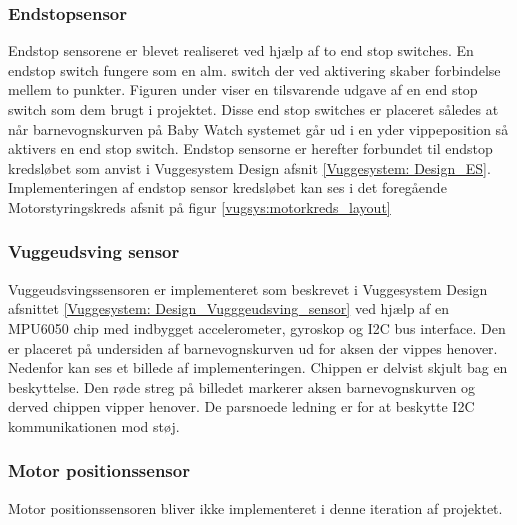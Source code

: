 \subsubsection{Endstopsensor}\label{Vuggesystem: Implementering_ES} 
Endstop sensorene er blevet realiseret ved hjælp af to end stop switches. En endstop switch fungere som en alm. switch der ved aktivering skaber forbindelse mellem to punkter. Figuren under viser en tilsvarende udgave af en end stop switch som dem brugt i projektet.
 Disse end stop switches er placeret således at når barnevognskurven på Baby Watch systemet går ud i en yder vippeposition så aktivers en end stop switch.
Endstop sensorne er herefter forbundet til endstop kredsløbet som anvist i Vuggesystem Design afsnit \vref{Vuggesystem: Design_ES}. \\
Implementeringen af endstop sensor kredsløbet kan ses i det foregående Motorstyringskreds afsnit på figur \vref{vugsys:motorkreds_layout}
\newpage
\subsubsection{Vuggeudsving sensor}
\label{Vuggesystem: Implementering_VuggeudsvingSensor}
Vuggeudsvingssensoren er implementeret som beskrevet i Vuggesystem Design afsnittet \vref{Vuggesystem: Design_Vugggeudsving_sensor} ved hjælp af en MPU6050 chip med indbygget accelerometer, gyroskop og I2C bus interface. Den er placeret på undersiden af barnevognskurven ud for aksen der vippes henover. Nedenfor kan ses et billede af implementeringen. 
Chippen er delvist skjult bag en beskyttelse. Den røde streg på billedet markerer aksen barnevognskurven og derved chippen vipper henover. 
De parsnoede ledning er for at beskytte I2C kommunikationen mod støj.


\subsubsection{Motor positionssensor}
Motor positionssensoren bliver ikke implementeret i denne iteration af projektet.

\newpage
